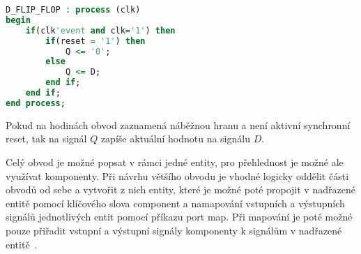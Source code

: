 \documentclass{report}
\begin{document}
\begin{lstlisting}[language=VHDL]
D_FLIP_FLOP : process (clk)
begin
	if(clk'event and clk='1') then       
		if(reset = '1') then
			Q <= '0';
		else 
			Q <= D;
		end if;
	end if;
end process;
\end{lstlisting}
Pokud na hodinách obvod zaznamená náběžnou hranu a není aktivní synchronní reset, tak na signál $Q$ zapíše aktuální hodnotu na signálu $D$. \par
Celý obvod je možné popsat v rámci jedné entity, pro přehlednost je možné ale využívat komponenty. Při návrhu většího obvodu je vhodné logicky oddělit části obvodů od sebe a vytvořit z nich entity, které je možné poté propojit v nadřazené entitě pomocí klíčového slova component a namapování vstupních a výstupních signálů jednotlivých entit pomocí příkazu port map. Při mapování je poté možné pouze přiřadit vstupní a výstupní signály komponenty k signálům v nadřazené entitě~\cite{vhdlI}.  
\end{document}
